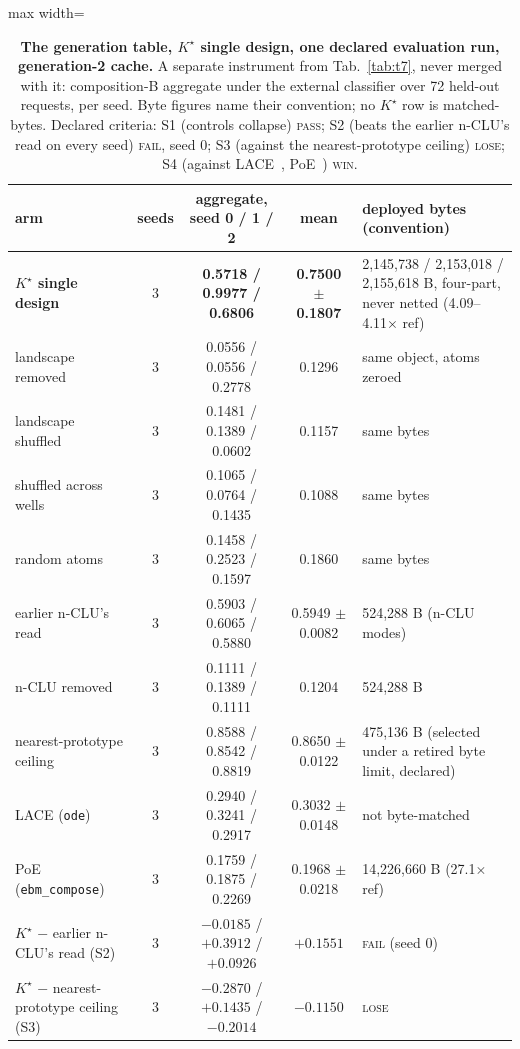 \documentclass{article} %
\newcommand{\Kstar}{\ensuremath{K^{\star}}}
\begin{document}
\begin{table}[h]
\centering\scriptsize
\caption{\textbf{The generation table, $\Kstar$ single design, one declared evaluation run, %
generation-2 cache.} A separate instrument from Tab.~\ref{tab:t7}, never merged with it:
composition-B aggregate under the external classifier over 72 held-out requests, per seed. %
Byte figures name their convention; no $\Kstar$ row is matched-bytes. Declared criteria: S1
(controls collapse) \textsc{pass}; S2 (beats the earlier n-CLU's read on every seed) \textsc{fail}, seed 0;
S3 (against the nearest-prototype ceiling) \textsc{lose}; S4 (against LACE~\citep{nie_controllable_2021}, PoE~\citep{hinton_training_2002}) \textsc{win}.}
\label{tab:gentable-kstar}
\setlength{\tabcolsep}{2.4pt}
\begin{adjustbox}{max width=\linewidth}\begin{tabular}{lcccp{4.2cm}}
\toprule
arm & seeds & aggregate, seed 0 / 1 / 2 & mean & deployed bytes (convention) \\
\midrule
\textbf{$\Kstar$ single design} & 3 & \textbf{0.5718 / 0.9977 / 0.6806} & \textbf{0.7500 $\pm$ 0.1807} & 2,145,738 / 2,153,018 / 2,155,618 B, four-part, never netted (4.09--4.11$\times$ ref) \\
\quad landscape removed & 3 & 0.0556 / 0.0556 / 0.2778 & 0.1296 & same object, atoms zeroed \\
\quad landscape shuffled & 3 & 0.1481 / 0.1389 / 0.0602 & 0.1157 & same bytes \\
\quad shuffled across wells & 3 & 0.1065 / 0.0764 / 0.1435 & 0.1088 & same bytes \\
\quad random atoms & 3 & 0.1458 / 0.2523 / 0.1597 & 0.1860 & same bytes \\
earlier n-CLU's read & 3 & 0.5903 / 0.6065 / 0.5880 & 0.5949 $\pm$ 0.0082 & 524,288 B (n-CLU modes) \\
n-CLU removed & 3 & 0.1111 / 0.1389 / 0.1111 & 0.1204 & 524,288 B \\
nearest-prototype ceiling & 3 & 0.8588 / 0.8542 / 0.8819 & 0.8650 $\pm$ 0.0122 & 475,136 B (selected under a retired byte limit, declared) \\
LACE (\texttt{ode}) & 3 & 0.2940 / 0.3241 / 0.2917 & 0.3032 $\pm$ 0.0148 & not byte-matched \\
PoE (\texttt{ebm\_compose}) & 3 & 0.1759 / 0.1875 / 0.2269 & 0.1968 $\pm$ 0.0218 & 14,226,660 B (27.1$\times$ ref) \\
\midrule
$\Kstar$ $-$ earlier n-CLU's read (S2) & 3 & $-0.0185$ / $+0.3912$ / $+0.0926$ & $+0.1551$ & \textsc{fail} (seed 0) \\
$\Kstar$ $-$ nearest-prototype ceiling (S3) & 3 & $-0.2870$ / $+0.1435$ / $-0.2014$ & $-0.1150$ & \textsc{lose} \\
\bottomrule
\end{tabular}\end{adjustbox}
\end{table}
\end{document}

